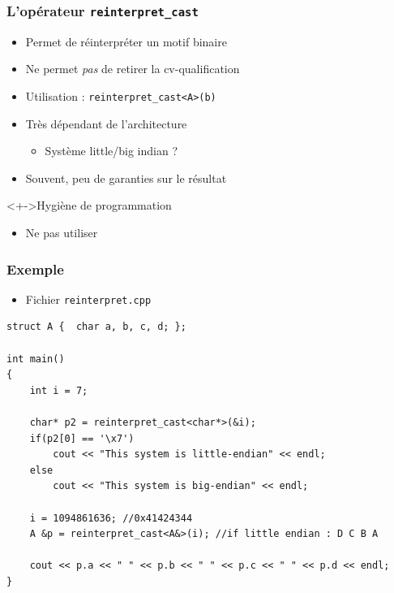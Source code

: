\begin{frame}
\frametitle{L'opérateur \texttt{reinterpret\_cast}}
\begin{itemize}[<+->]
\item Permet de réinterpréter un motif binaire
\item Ne permet \emph{pas} de retirer la cv-qualification
\item Utilisation : \lstinline|reinterpret_cast<A>(b)|
\item Très dépendant de l'architecture
	\begin{itemize}
	\item Système little/big indian ?
	\end{itemize}
\item Souvent, peu de garanties sur le résultat
\end{itemize}
\begin{block}<+->{Hygiène de programmation}
	\begin{itemize}[<+->]
	\item Ne pas utiliser
	\end{itemize}
\end{block}
\end{frame}

\begin{frame}[containsverbatim]
\frametitle{Exemple}
\begin{itemize}
\item Fichier \texttt{reinterpret.cpp}
\end{itemize}
\begin{lstlisting}
struct A {  char a, b, c, d; };

int main()
{
    int i = 7;

    char* p2 = reinterpret_cast<char*>(&i);
    if(p2[0] == '\x7')
        cout << "This system is little-endian" << endl;
    else
        cout << "This system is big-endian" << endl;

    i = 1094861636; //0x41424344
    A &p = reinterpret_cast<A&>(i); //if little endian : D C B A

    cout << p.a << " " << p.b << " " << p.c << " " << p.d << endl;
}
\end{lstlisting}
\end{frame}

